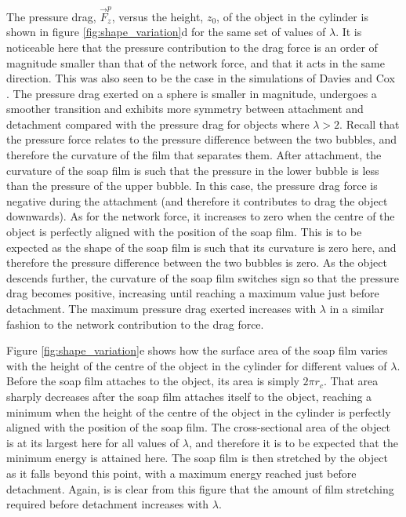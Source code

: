 \documentclass[preprint]{revtex4-1}
\begin{document}
The pressure drag, $\vec{F}^p_z$, versus the height, $z_0$, of the object in the cylinder is shown in figure \ref{fig:shape_variation}d for the same set of values of $\lambda$. It is noticeable here that the pressure contribution to the drag force is an order of magnitude smaller than that of the network force, and that it acts in the same direction. This was also seen to be the case in the simulations of Davies and Cox \cite{Davies12}. The pressure drag exerted on a sphere is smaller in magnitude, undergoes a smoother transition and exhibits more symmetry between attachment and detachment compared with the pressure drag for objects where $\lambda>2$. Recall that the pressure force relates to the pressure difference between the two bubbles, and therefore the curvature of the film that separates them. After attachment, the curvature of the soap film is such that the pressure in the lower bubble is less than the pressure of the upper bubble. In this case, the pressure drag force is negative during the attachment (and therefore it contributes to drag the object downwards). As for the network force, it increases to zero when the centre of the object is perfectly aligned with the position of the soap film. This is to be expected as the shape of the soap film is such that its curvature is zero here, and therefore the pressure difference between the two bubbles is zero. As the object descends further, the curvature of the soap film switches sign so that the pressure drag becomes positive, increasing until reaching a maximum value just before detachment. The maximum pressure drag exerted increases with $\lambda$ in a similar fashion to the network contribution to the drag force.

Figure \ref{fig:shape_variation}e shows how the surface area of the soap film varies with the height of the centre of the object in the cylinder for different values of $\lambda$. Before the soap film attaches to the object, its area is simply $2\pi r_c$. That area sharply decreases after the soap film attaches itself to the object, reaching a minimum when the height of the centre of the object in the cylinder is perfectly aligned with the position of the soap film. The cross-sectional area of the object is at its largest here for all values of $\lambda$, and therefore it is to be expected that the minimum energy is attained here. The soap film is then stretched by the object as it falls beyond this point, with a maximum energy reached just before detachment. Again, is is clear from this figure that the amount of film stretching required before detachment increases with $\lambda$. 
\end{document}
